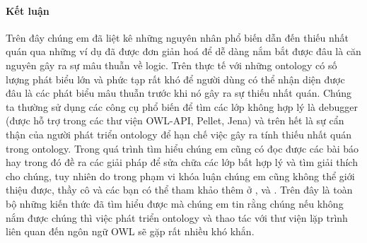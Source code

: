 
\paragraph{Kết luận}
Trên đây chúng em đã liệt kê những nguyên nhân phổ biến dẫn đến thiếu nhất quán qua những ví dụ đã được đơn giản hoá để dễ dàng nắm bắt được đâu là căn nguyên gây ra sự mâu thuẫn về logic. Trên thực tế với những ontology có số lượng phát biểu lớn và phức tạp rất khó để người dùng có thể nhận diện được đâu là các phát biểu mâu thuẫn trước khi nó gây ra sự thiếu nhất quán. Chúng ta thường sử dụng các công cụ phổ biến để tìm các lớp không hợp lý là debugger (được hỗ trợ trong các thư viện OWL-API, Pellet, Jena) và trên hết là sự cẩn thận của người phát triển ontology để hạn chế việc gây ra tính thiếu nhất quán trong ontology. Trong quá trình tìm hiểu chúng em cũng có đọc được các bài báo hay trong đó đề ra các giải pháp để sửa chữa các lớp bất hợp lý và tìm giải thích cho chúng, tuy nhiên do trong phạm vi khóa luận chúng em cũng không thể giới thiệu được, thầy cô và các bạn có thể tham khảo thêm ở \cite{repair}, \cite{axiomPinpoint} và \cite{matt_horridge}. Trên đây là toàn bộ những kiến thức đã tìm hiểu được mà chúng em tin rằng chúng nếu không nắm được chúng thì việc phát triển ontology và thao tác với thư viện lặp trình liên quan đến ngôn ngữ OWL sẽ gặp rất nhiều khó khắn.

